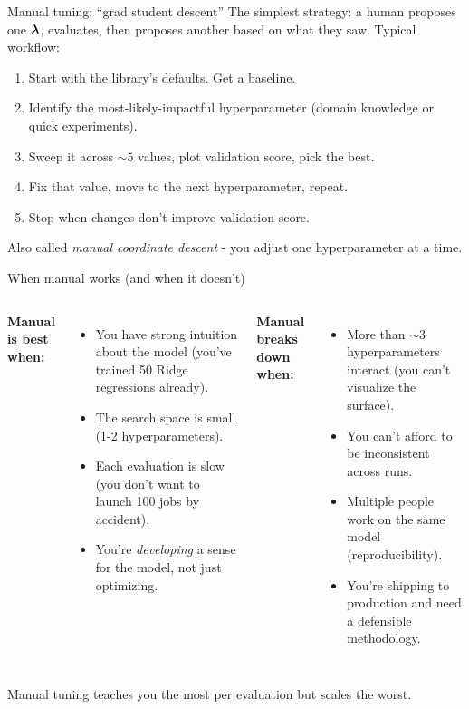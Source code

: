 \documentclass[aspectratio=169]{beamer}
\begin{document}
\begin{frame}{Manual tuning: ``grad student descent''}
  The simplest strategy: a human proposes one $\bm{\lambda}$, evaluates, then proposes another based on what they saw.
  \vfill
  Typical workflow:
  \begin{enumerate}
    \item Start with the library's defaults. Get a baseline.
    \item Identify the most-likely-impactful hyperparameter (domain knowledge or quick experiments).
    \item Sweep it across $\sim 5$ values, plot validation score, pick the best.
    \item Fix that value, move to the next hyperparameter, repeat.
    \item Stop when changes don't improve validation score.
  \end{enumerate}
  \vfill
  Also called \emph{manual coordinate descent} - you adjust one hyperparameter at a time.
  \vfill
\end{frame}

\begin{frame}{When manual works (and when it doesn't)}
  \begin{columns}[T]
    \textbf{Manual is best when:}
    \begin{itemize}\small
      \item You have strong intuition about the model (you've trained 50 Ridge regressions already).
      \item The search space is small (1-2 hyperparameters).
      \item Each evaluation is slow (you don't want to launch 100 jobs by accident).
      \item You're \emph{developing} a sense for the model, not just optimizing.
    \end{itemize}
    \textbf{Manual breaks down when:}
    \begin{itemize}\small
      \item More than $\sim 3$ hyperparameters interact (you can't visualize the surface).
      \item You can't afford to be inconsistent across runs.
      \item Multiple people work on the same model (reproducibility).
      \item You're shipping to production and need a defensible methodology.
    \end{itemize}
  \end{columns}
  \vfill
  Manual tuning teaches you the most per evaluation but scales the worst.
\end{frame}
\end{document}
